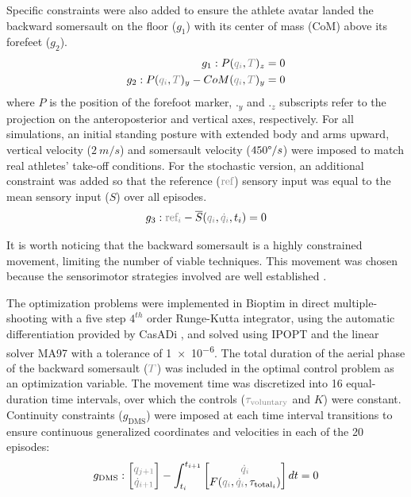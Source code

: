 \documentclass[10pt,letterpaper]{article}
\begin{document}
Specific constraints were also added to ensure the athlete avatar landed the backward somersault on the floor ($g_1$) with its center of mass (CoM) above its forefeet ($g_2$).
%
\begin{eqnarray}
g_1 : P(\textcolor{gray}{q_i}, \textcolor{gray}{T})_z = 0 \\
g_2: P(\textcolor{gray}{q_i}, \textcolor{gray}{T})_y - CoM(\textcolor{gray}{q_i}, \textcolor{gray}{T})_y = 0
\end{eqnarray}
%
\noindent where $P$ is the position of the forefoot marker, $._y$ and $._z$ subscripts refer to the projection on the anteroposterior and vertical axes, respectively.
For all simulations, an initial standing posture with extended body and arms upward, vertical velocity ($2~m/s$) and somersault velocity ($450\degree/s$) were imposed to match real athletes' take-off conditions.
For the stochastic version, an additional constraint was added so that the reference ($\textcolor{gray}{\text{ref}}$) sensory input was equal to the mean sensory input ($S$) over all episodes.
\begin{equation}
g_3: \textcolor{gray}{\text{ref}_i} - \overline{S}(\textcolor{gray}{q_i}, \textcolor{gray}{\dot{q}_i}, t_i) = 0
\end{equation} 

It is worth noticing that the backward somersault is a highly constrained movement, limiting the number of viable techniques.
This movement was chosen because the sensorimotor strategies involved are well established \cite{bardy1998body, heinen2011evidence, davlin2004gymnasts, luis2008visual, natrup2021gaze}. 


The optimization problems were implemented in Bioptim \cite{michaud2022bioptim} in direct multiple-shooting with a five step $4^{th}$ order Runge-Kutta integrator, using the automatic differentiation provided by CasADi \cite{Andersson2019}, and solved using IPOPT \cite{wachter2006implementation} and the linear solver MA97 \cite{hogg2011hsl_ma97} with a tolerance of \num{1e-6}.
The total duration of the aerial phase of the backward somersault ($\textcolor{gray}{T}$) was included in the optimal control problem as an optimization variable.
The movement time was discretized into 16 equal-duration time intervals, over which the controls ($\textcolor{gray}{\tau_{\text{voluntary}}}$ and $K$) were constant.
Continuity constraints ($g_{\text{DMS}}$) were imposed at each time interval transitions to ensure continuous generalized coordinates and velocities in each of the 20 episodes:
%
\begin{equation}
g_{\text{DMS}} :  
\begin{bmatrix}
\textcolor{gray}{q_{j+1}} \\ 
\textcolor{gray}{\dot{q}_{i+1}}
\end{bmatrix} - \int_{t_i}^{t_{i+1}}{
\begin{bmatrix}
\textcolor{gray}{\dot{q}_i} \\ 
F(\textcolor{gray}{q_i}, \textcolor{gray}{\dot{q}_i}, \tau_{{\text{total}}_i})
\end{bmatrix}
dt} = 0
\end{equation}
\end{document}
